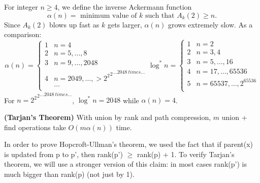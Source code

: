 For integer $n\geq 4$, we define the inverse Ackermann function 
$$\alpha(n)=\text{ minimum value of $k$ such that }A_k(2)\geq n.$$
Since $A_k(2)$ blows up fast as $k$ gets larger, $\alpha(n)$ grows extremely slow. As a comparison:
\begin{equation*}
\alpha(n)=\begin{cases}
1&n=4\\
2&n=5,\dots,8\\
3&n=9,\dots,2048\\
4&n=2049,\dots,>{{2^2}^2}^{\dots 2048\:times\dots}\\
&\dots\\
\end{cases}
\log^*n=\begin{cases}
1&n=2\\
2&n=3,4\\
3&n=5,\dots,16\\
4&n=17,\dots,65536\\
5&n=65537,\dots,2^{65536}\\
\end{cases}
\end{equation*}
For $n={{2^2}^2}^{\dots 2048\:times\dots}$, $\log^*n=2048$ while $\alpha(n)=4$.
\begin{theorem} \textbf{(Tarjan's Theorem)}
With union by rank and path compression, $m$ union + find operations take $O(m\alpha(n))$ time.
\end{theorem}
In order to prove Hopcroft-Ullman's theorem, we used the fact that if parent(x) is updated from p to p', then rank(p') $\geq$ rank(p) + 1. To verify Tarjan's theorem, we will use a stronger version of this claim: in most cases rank(p') is much bigger than rank(p) (not just by 1). 
